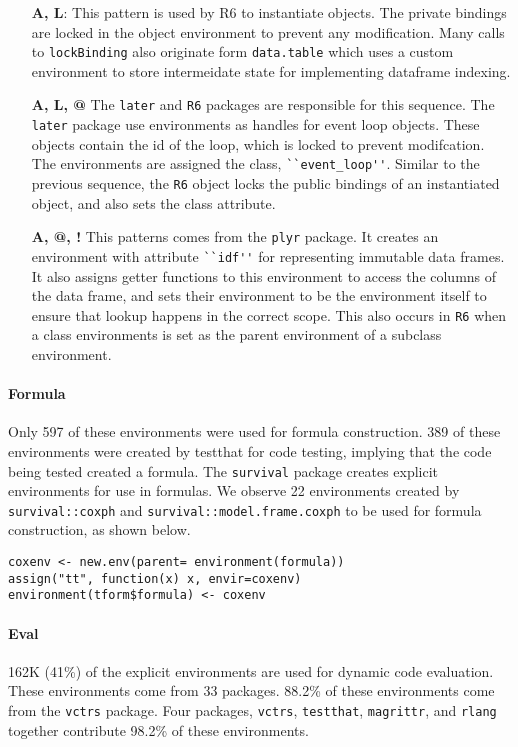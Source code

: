 \documentclass[10pt,review,sigplan,anonymous=true,authorversion=true,nonacm=true]{acmart}
\newcommand{\code}[1]{\lstinline |#1|\xspace}
\begin{document}
\begin{itemize}
\item[\textbf{A, L}:] This pattern is used by R6 to instantiate objects. The
  private bindings are locked in the object environment to prevent
  any modification. Many calls to \code{lockBinding} also originate form
  \code{data.table} which uses a custom environment to store intermeidate state
  for implementing dataframe indexing.

\item[\textbf{A, L, @}] The \code{later} and \code{R6} packages are responsible
  for this sequence. The \code{later} package use environments as handles for
  event loop objects. These objects contain the id of the loop, which is locked
  to prevent modifcation. The environments are assigned the class,
  \code{``event_loop''}. Similar to the previous sequence, the \code{R6} object
  locks the public bindings of an instantiated object, and also sets the class
  attribute.

\item[\textbf{A, @, !}] This patterns comes from the \code{plyr} package. It
  creates an environment with attribute \code{``idf''} for representing
  immutable data frames. It also assigns getter functions to this environment to
  access the columns of the data frame, and sets their environment to be the
  environment itself to ensure that lookup happens in the correct scope. This
  also occurs in \code{R6} when a class environments is set as the parent
  environment of a subclass environment.
\end{itemize}
\noindent

\paragraph{Formula}
Only 597 of these environments were used for formula construction. 389 of these
environments were created by testthat for code testing, implying that the code
being tested created a formula. The \code{survival} package creates explicit
environments for use in formulas. We observe 22 environments created by
\code{survival::coxph} and \code{survival::model.frame.coxph} to be used for
formula construction, as shown below.

\begin{lstlisting}
coxenv <- new.env(parent= environment(formula))
assign("tt", function(x) x, envir=coxenv)
environment(tform$formula) <- coxenv
\end{lstlisting}



\paragraph{Eval}
162K (41\%) of the explicit environments are used for dynamic code evaluation.
These environments come from 33 packages. 88.2\% of these environments come from
the \code{vctrs} package. Four packages, \code{vctrs}, \code{testthat},
\code{magrittr}, and \code{rlang} together contribute 98.2\% of these
environments.
\end{document}
